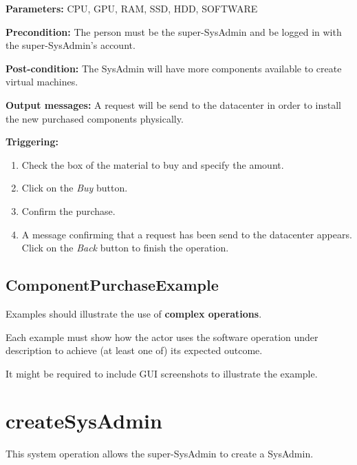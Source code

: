 \begin{description}

\item \textbf{Parameters:} CPU, GPU, RAM, SSD, HDD, SOFTWARE
\item \textbf{Precondition:} The person must be the super-SysAdmin and be logged
in with the super-SysAdmin's account.
\item \textbf{Post-condition:} The SysAdmin will have more components
available to create virtual machines.
\item \textbf{Output messages:} A request will be send to the datacenter in
order to install the new purchased components physically.

\item \textbf{Triggering:}
\begin{enumerate}
\item Check the box of the material to buy and specify the amount.
\item Click on the \emph{Buy} button.
\item Confirm the purchase.
\item A message confirming that a request has been send to the datacenter
appears. Click on the \emph{Back} button to finish the operation.
\end{enumerate}

 
\end{description}

\subsection{ComponentPurchaseExample}
Examples should illustrate the use of \textbf{complex operations}.

Each example must show how the actor uses the software operation under
description to achieve (at least one of) its expected outcome.

It might be required to include GUI screenshots to illustrate the example.






\section{createSysAdmin}
\label{operation:createSysAdmin}
This system operation allows the super-SysAdmin to create a SysAdmin.

